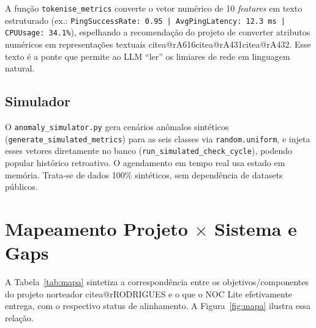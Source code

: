 \documentclass[12pt,a4paper]{article}
\makeatletter
\newcommand{\citea}[1]{\begingroup\edef\@currentlabel{\csname citea@#1\endcsname}\@currentlabel\endgroup}
\makeatother
\begin{document}
A função \texttt{tokenise\_metrics} converte o vetor numérico de 10 \textit{
features} em texto estruturado (ex.: \texttt{PingSuccessRate: 0.95 |
AvgPingLatency: 12.3 ms | CPUUsage: 34.1\%}), espelhando a recomendação do
projeto de converter atributos numéricos em representações textuais
\citea{rA616}\citea{rA431}\citea{rA432}. Esse texto é a ponte que permite ao LLM ``ler'' os limiares
de rede em linguagem natural.

\subsection{Simulador}
\label{sec:sim}

O \texttt{anomaly\_simulator.py} gera cenários anômalos sintéticos
(\texttt{generate\_simulated\_metrics}) para as seis classes via
\texttt{random.uniform}, e injeta esses vetores diretamente no banco
(\texttt{run\_simulated\_check\_cycle}), podendo popular histórico retroativo.
O agendamento em tempo real usa estado em memória. Trata-se de dados 100\%
sintéticos, sem dependência de datasets públicos.

\section{Mapeamento Projeto $\times$ Sistema e Gaps}
\label{sec:mapeamento}

A Tabela~\ref{tab:mapa} sintetiza a correspondência entre os objetivos/componentes
do projeto norteador \citea{rRODRIGUES} e o que o NOC Lite efetivamente entrega, com
o respectivo status de alinhamento. A Figura~\ref{fig:mapa} ilustra essa
relação.
\end{document}
